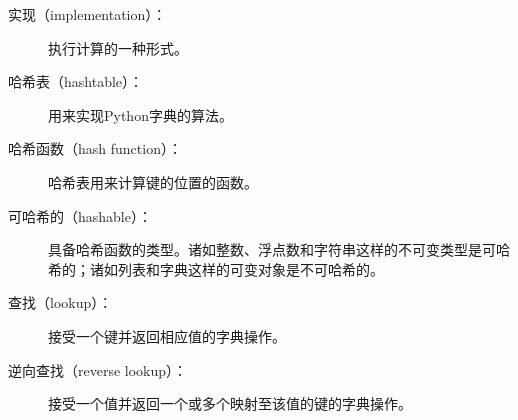 \begin{description}
\item[实现（implementation）：] 执行计算的一种形式。



\item[哈希表（hashtable）：] 用来实现Python字典的算法。



\item[哈希函数（hash function）：] 哈希表用来计算键的位置的函数。



\item[可哈希的（hashable）：] 具备哈希函数的类型。诸如整数、浮点数和字符串这样的不可变类型是可哈希的；诸如列表和字典这样的可变对象是不可哈希的。



\item[查找（lookup）：] 接受一个键并返回相应值的字典操作。



\item[逆向查找（reverse lookup）：] 接受一个值并返回一个或多个映射至该值的键的字典操作。




\end{description}
